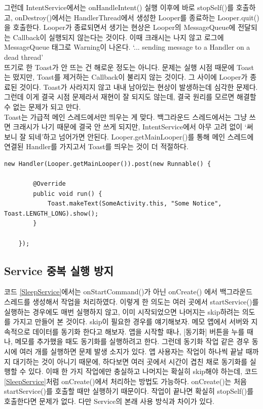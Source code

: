 그런데 IntentService에서는 onHandleIntent() 실행 이후에 바로 stopSelf()를 호출하고, onDestroy()에서는 HandlerThread에서 생성한 Looper를 종료하는 Looper.quit()을 호출한다. Looper가 종료되면서 생기는 현상은 Looper의 MessageQueue에 전달되는 Callback이 실행되지 않는다는 것이다.
이때 크래시는 나지 않고 로그에 MessageQueue 태그로 Warning이 나온다. `... sending message to a Handler on a dead thread'\\

뜨기로 한 Toast가 안 뜨는 건 해로운 정도는 아니다. 문제는 실행 시점 때문에 Toast는 떴지만, Toast를 제거하는 Callback이 불리지 않는 것이다. 그 사이에 Looper가 종료된 것이다.
Toast가 사라지지 않고 내내 남아있는 현상이 발생하는데 심각한 문제다. 
그런데 이게 결국 시점 문제라서 재현이 잘 되지도 않는데, 결국 원리를 모르면 해결할 수 없는 문제가 되고 만다.\\

Toast는 가급적 메인 스레드에서만 띄우는 게 맞다. 
백그라운드 스레드에서는 그냥 쓰면 크래시가 나기 때문에 결국 안 쓰게 되지만, IntentService에서 아무 고려 없이 `써보니 잘 되네'하고 넘어가면 안된다. Looper.getMainLooper()를 통해 메인 스레드에 연결된 Handler를 가지고서 Toast를 띄우는 것이 더 적절하다.
\begin{lstlisting}[frame=single]
	new Handler(Looper.getMainLooper()).post(new Runnable() {
	
		@Override
		public void run() {
			Toast.makeText(SomeActivity.this, "Some Notice", Toast.LENGTH_LONG).show();
		}
		
	});
\end{lstlisting}

\subsection{Service 중복 실행 방지}
코드 \ref{SleepService}에서는 onStartCommand()가 아닌 onCreate() 에서 백그라운드 스레드를 생성해서 작업을 처리하였다. 
이렇게 한 의도는 여러 곳에서 startService()를 실행하는 경우에도 매번 실행하지 않고, 이미 시작되었으면 나머지는 skip하려는 의도를 가지고 만들어 본 것이다.
skip이 필요한 경우를 얘기해보자. 
메모 앱에서 서버와 지속적으로 데이터를 동기화 한다고 해보자. 앱을 시작할 때나, [동기화] 버튼을 누를 때나, 메모를 추가했을 때도 동기화를 실행하려고 한다. 
그런데 동기화 작업 같은 경우 동시에 여러 개를 실행하면 문제 발생 소지가 있다. 
앱 사용자는 작업이 하나씩 끝날 때까지 대기하는 것이 아니기 때문에, 하다보면 여러 곳에서 시간이 겹친 채로 동기화를 실행할 수 있다.
이때 한 가지 작업에만 충실하고 나머지는 확실히 skip해야 하는데, 코드 \ref{SleepService}처럼 onCreate()에서 처리하는 방법도 가능하다. 
onCreate()는 처음 startService()를 호출할 때만 실행하기 때문이다. 
작업이 끝나면 확실히 stopSelf()를 호출한다면 문제가 없다. 다만 Service의 본래 사용 방식과 차이가 있다.\\

